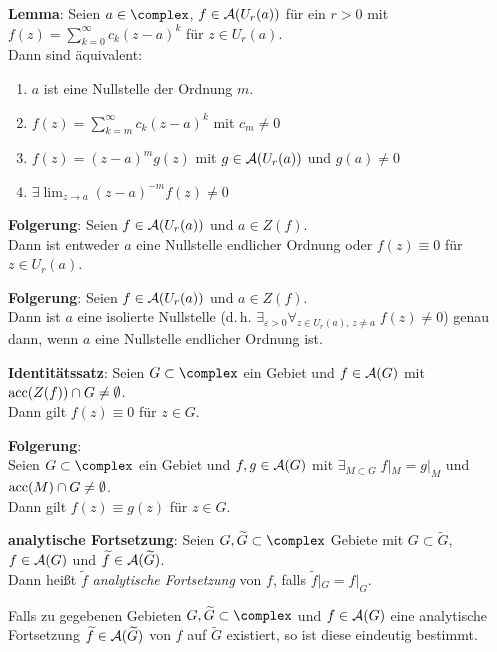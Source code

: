 \linie

\textbf{Lemma}:
Seien $a \in \complex$, $f \in \mathcal{A}(U_r(a))$ für ein $r > 0$ mit
$f(z) = \sum_{k=0}^\infty c_k (z - a)^k$ für $z \in U_r(a)$.\\
Dann sind äquivalent:
\begin{enumerate}
    \item
    $a$ ist eine Nullstelle der Ordnung $m$.

    \item
    $f(z) = \sum_{k=m}^\infty c_k (z - a)^k$ mit $c_m \not= 0$

    \item
    $f(z) = (z - a)^m g(z)$ mit $g \in \mathcal{A}(U_r(a))$ und $g(a) \not= 0$

    \item
    $\exists \lim_{z \to a} (z - a)^{-m} f(z) \not= 0$
\end{enumerate}

\textbf{Folgerung}:
Seien $f \in \mathcal{A}(U_r(a))$ und $a \in Z(f)$.\\
Dann ist entweder $a$ eine Nullstelle endlicher Ordnung oder
$f(z) \equiv 0$ für $z \in U_r(a)$.

\textbf{Folgerung}:
Seien $f \in \mathcal{A}(U_r(a))$ und $a \in Z(f)$.\\
Dann ist $a$ eine isolierte Nullstelle
(d.\,h. $\exists_{\varepsilon > 0} \forall_{z \in U_r(a),\, z \not= a}\;
f(z) \not= 0$) genau dann, wenn $a$ eine Nullstelle endlicher Ordnung ist.

\linie

\textbf{Identitätssatz}:
Seien $G \subset \complex$ ein Gebiet und $f \in \mathcal{A}(G)$ mit
$\operatorname{acc}(Z(f)) \cap G \not= \emptyset$.\\
Dann gilt $f(z) \equiv 0$ für $z \in G$.

\textbf{Folgerung}:\\
Seien $G \subset \complex$ ein Gebiet und $f, g \in \mathcal{A}(G)$ mit
$\exists_{M \subset G}\; f|_M = g|_M$ und $\operatorname{acc}(M) \cap G \not= \emptyset$.\\
Dann gilt $f(z) \equiv g(z)$ für $z \in G$.

\textbf{analytische Fortsetzung}:
Seien $G, \widetilde{G} \subset \complex$ Gebiete mit $G \subset \widetilde{G}$,
$f \in \mathcal{A}(G)$ und $\widetilde{f} \in \mathcal{A}(\widetilde{G})$.\\
Dann heißt $\widetilde{f}$ \emph{analytische Fortsetzung} von $f$,
falls $\widetilde{f}|_G = f|_G$.

Falls zu gegebenen Gebieten $G, \widetilde{G} \subset \complex$ und
$f \in \mathcal{A}(G)$ eine analytische Fortsetzung
$\widetilde{f} \in \mathcal{A}(\widetilde{G})$ von $f$
auf $\widetilde{G}$ existiert, so ist diese eindeutig bestimmt.

